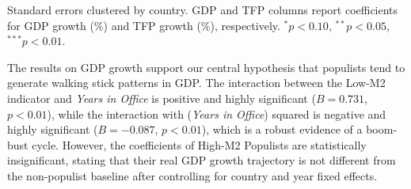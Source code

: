 \documentclass{OUP-EJ}
\begin{document}
\begin{table}[ht]
\centering
\caption{TWFE Walking Stick Effects on GDP and TFP Growth}
\label{tab:twfe_gdp_tfp}

\begin{tablenotes}Standard errors clustered by country. 
GDP and TFP columns report coefficients for GDP growth (\%) and TFP growth (\%), respectively. 
$^{*} p<0.10$, $^{**} p<0.05$, $^{***} p<0.01$.
\end{tablenotes}

\end{table}

The results on GDP growth support our central hypothesis that populists tend to generate walking stick patterns in GDP.  The interaction between the Low-M2 indicator and \textit{Years in Office} is positive and highly significant ($B=0.731$, $p < 0.01$), while the interaction with (\textit{Years in Office}) squared is negative and highly significant ($B=-0.087$, $p < 0.01$), which is a robust evidence of a boom-bust cycle. However, the coefficients of High-M2 Populists are statistically insignificant, stating that their real GDP growth trajectory is not different from the non-populist baseline after controlling for country and year fixed effects. 
\end{document}

